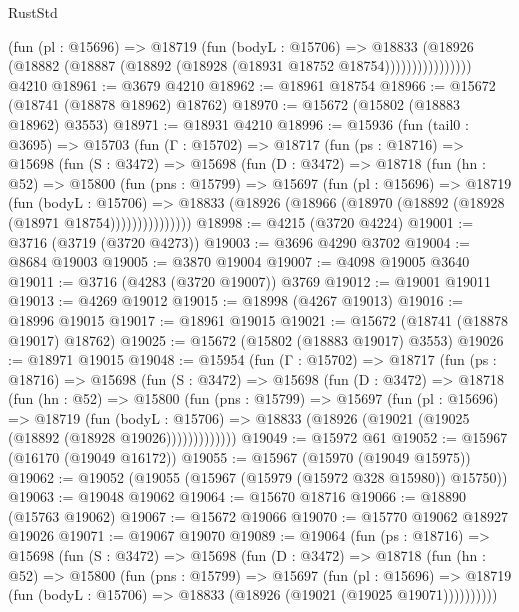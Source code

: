 \begin{lexlean}{RustStd}
\begin{coremodule}
                    (fun (pl : @15696) =>
                    @18719
                      (fun (bodyL : @15706) =>
                      @18833
                        (@18926
                          (@18882 (@18887 (@18892 (@18928 (@18931 @18752 @18754))))))))))))))))
    @4210
@18961 := @3679 @4210
@18962 := @18961 @18754
@18966 := @15672 (@18741 (@18878 @18962) @18762)
@18970 := @15672 (@15802 (@18883 @18962) @3553)
@18971 := @18931 @4210
@18996 := @15936
    (fun (tail0 : @3695) =>
    @15703
      (fun (Γ : @15702) =>
      @18717
        (fun (ps : @18716) =>
        @15698
          (fun (S : @3472) =>
          @15698
            (fun (D : @3472) =>
            @18718
              (fun (hn : @52) =>
              @15800
                (fun (pns : @15799) =>
                @15697
                  (fun (pl : @15696) =>
                  @18719
                    (fun (bodyL : @15706) =>
                    @18833 (@18926 (@18966 (@18970 (@18892 (@18928 (@18971 @18754)))))))))))))))
@18998 := @4215 (@3720 @4224)
@19001 := @3716 (@3719 (@3720 @4273))
@19003 := @3696 @4290 @3702
@19004 := @8684 @19003
@19005 := @3870 @19004
@19007 := @4098 @19005 @3640
@19011 := @3716 (@4283 (@3720 @19007)) @3769
@19012 := @19001 @19011
@19013 := @4269 @19012
@19015 := @18998 (@4267 @19013)
@19016 := @18996 @19015
@19017 := @18961 @19015
@19021 := @15672 (@18741 (@18878 @19017) @18762)
@19025 := @15672 (@15802 (@18883 @19017) @3553)
@19026 := @18971 @19015
@19048 := @15954
    (fun (Γ : @15702) =>
    @18717
      (fun (ps : @18716) =>
      @15698
        (fun (S : @3472) =>
        @15698
          (fun (D : @3472) =>
          @18718
            (fun (hn : @52) =>
            @15800
              (fun (pns : @15799) =>
              @15697
                (fun (pl : @15696) =>
                @18719
                  (fun (bodyL : @15706) =>
                  @18833 (@18926 (@19021 (@19025 (@18892 (@18928 @19026)))))))))))))
@19049 := @15972 @61
@19052 := @15967 (@16170 (@19049 @16172))
@19055 := @15967 (@15970 (@19049 @15975))
@19062 := @19052 (@19055 (@15967 (@15979 (@15972 @328 @15980)) @15750))
@19063 := @19048 @19062
@19064 := @15670 @18716
@19066 := @18890 (@15763 @19062)
@19067 := @15672 @19066
@19070 := @15770 @19062 @18927 @19026
@19071 := @19067 @19070
@19089 := @19064
    (fun (ps : @18716) =>
    @15698
      (fun (S : @3472) =>
      @15698
        (fun (D : @3472) =>
        @18718
          (fun (hn : @52) =>
          @15800
            (fun (pns : @15799) =>
            @15697
              (fun (pl : @15696) =>
              @18719 (fun (bodyL : @15706) => @18833 (@18926 (@19021 (@19025 @19071))))))))))

\end{coremodule}
\end{lexlean}
